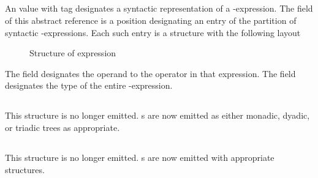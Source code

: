 


\subsection{}
\label{sec:ifc:ExprSort:Alignof}

An  value with tag  designates a syntactic representation
of a -expression.
The  field of this abstract reference is a position designating an entry of the partition
of syntactic -expressions.  Each such entry is a structure with the following layout
%
\begin{figure}[H]
	\centering
	\caption{Structure of  expression}
	\label{fig:ifc:ExprSort:Alignof}
\end{figure}

The  field designates the operand to the  operator in that expression.
The  field designates the type of the entire -expression.




\subsection{}
\label{sec:ifc:ExprSort:New}

This structure is no longer emitted. s are now emitted as either monadic, dyadic, or triadic trees as appropriate.



\subsection{}
\label{sec:ifc:ExprSort:Delete}

This structure is no longer emitted. s are now emitted with appropriate structures.

